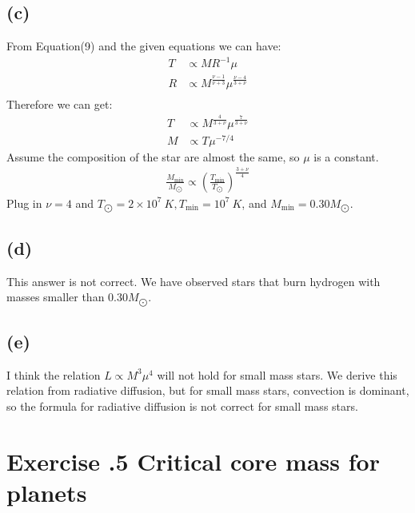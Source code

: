 \documentclass[a4paper,12pt]{article}
\begin{document}
\subsection*{(c)}
From Equation(9) and the given equations we can have:
\begin{align*}
    T &\propto MR^{-1} \mu \\
    R &\propto M^{\frac{\nu -1}{\nu +3}} \mu^{\frac{\nu -4}{3+\nu }} \\
\end{align*}
Therefore we can get:
\begin{align*}
    T &\propto M^{\frac{4}{3+\nu}} \mu^{\frac{7}{3+\nu}} \\
    M &\propto T^{} \mu ^{-7/4}
\end{align*}
Assume the composition of the star are almost the same, so $\mu$ is a constant.
\begin{align*}
    \frac{M_{\text{min}}}{M_{\bigodot}} \propto (\frac{T_{\text{min}}}{T_{\bigodot}})^{\frac{3+\nu}{4}}
\end{align*}
Plug in $\nu=4$ and $T_{\bigodot} = 2\times 10^7 \ K, T_{\text{min}} = 10^7\ K$, and $M_{\text{min}} = 0.30 M_{\bigodot}$.

\subsection*{(d)}
This answer is not correct. We have observed stars that burn hydrogen with masses smaller than $0.30 M_{\bigodot}$.

\subsection*{(e)}
I think the relation $L \propto M^3 \mu^4$ will not hold for small mass stars. We derive this relation from 
radiative diffusion, but for small mass stars, convection is dominant, so the formula for radiative diffusion 
is not correct for small mass stars.

\section*{\textbf{Exercise \uppercase\expandafter{}.5 Critical core mass for planets}}
\end{document}
